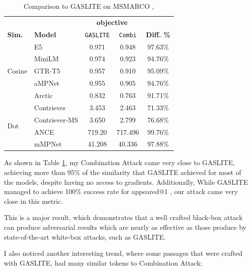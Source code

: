 \documentclass[a4paper, sigconf]{acmart}
\begin{document}
\begin{table}[h!]
\caption{Comparison to GASLITE on MSMARCO \cite{bentov2024},\cite{bajaj2018}}
\label{table:gaslite}
  \begin{tabular}{ll|cc|c}
  \hline
  & & \multicolumn{2}{c|}{\textbf{objective}} & \\
  \textbf{Sim.} & \textbf{Model} & \texttt{GASLITE} & \texttt{Combi} & \textbf{Diff. \%} \\
  \hline
  \multirow{5}{*}{Cosine} & E5 & 0.971 & 0.948 & 97.63\% \\
  \hhline{~----}
  & MiniLM & 0.974 & 0.923 & 94.76\% \\
  \hhline{~----}
  & GTR-T5 & 0.957 & 0.910 & 95.09\% \\
  \hhline{~----}
  & aMPNet & 0.955 & 0.905 & 94.76\% \\
  \hhline{~----}
  & Arctic & 0.832 & 0.763 & 91.71\% \\
  \hline
  \multirow{4}{*}{Dot} & Contriever & 3.453 & 2.463 & 71.33\% \\
  \hhline{~----}
  & Contriever-MS & 3.650 & 2.799 & 76.68\% \\
  \hhline{~----}
  & ANCE & 719.20 & 717.496 & 99.76\% \\
  \hhline{~----}
  & mMPNet & 41.208 & 40.336 & 97.88\% \\
  \hline
 \end{tabular}
 \end{table}
 
As shown in Table \ref{table:gaslite}, my Combination Attack came very close to GASLITE, achieving more than 95\% of the similarity that GASLITE achieved for most of the models, despite having no access to gradients. Additionally, While GASLITE managed to achieve 100\% success rate for appeared@1 \cite{bentov2024}, our attack came very close in this metric. 

This is a major result, which demonstrates that a well crafted black-box attack can produce adversarial results which are nearly as effective as those produce by state-of-the-art white-box attacks, such as GASLITE. 

I also noticed another interesting trend, where some passages that were crafted with GASLITE, had many similar tokens to Combination Attack:
\end{document}
